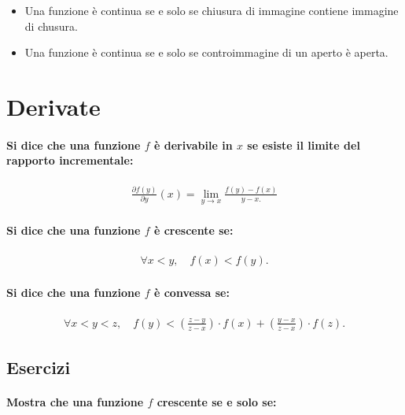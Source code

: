 \documentclass{article}
\begin{document}
\begin{itemize}
\item Una funzione è continua se e solo se chiusura di immagine contiene immagine di chusura.
\item Una funzione è continua se e solo se controimmagine di un aperto è aperta.
\end{itemize}

\newpage
\section*{Derivate}

\paragraph{Si dice che una funzione $f$ è derivabile in $x$ se esiste il limite del rapporto incrementale:}

\begin{align*}
\frac{\partial f(y)}{\partial y}(x) = \lim_{y \rightarrow x} \frac{f(y) - f(x)}{y - x.}
\end{align*}

\paragraph{Si dice che una funzione $f$ è crescente se:}

\begin{align*}
\forall x < y, \quad f(x) < f(y).
\end{align*}

\paragraph{Si dice che una funzione $f$ è convessa se:}

\begin{align*}
\forall x < y < z, \quad f(y) < \left(\frac{z - y}{z - x}\right) \cdot f(x) + \left(\frac{y - x}{z - x}\right) \cdot f(z).
\end{align*}

\subsection*{Esercizi}

\paragraph{Mostra che una funzione $f$ crescente se e solo se:}
\end{document}
